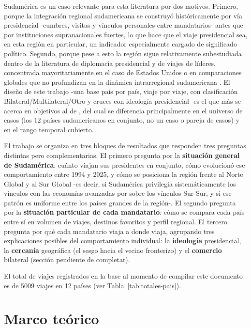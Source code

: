 \documentclass[11pt,a4paper]{article}
\begin{document}
Sudam\'erica es un caso relevante para esta literatura por dos motivos. Primero, porque la integraci\'on regional sudamericana se construy\'o hist\'oricamente por v\'ia presidencial -cumbres, visitas y v\'inculos personales entre mandatarios- antes que por instituciones supranacionales fuertes, lo que hace que el viaje presidencial sea, en esta regi\'on en particular, un indicador especialmente cargado de significado pol\'itico. Segundo, porque pese a esto la regi\'on sigue relativamente subestudiada dentro de la literatura de diplomacia presidencial y de viajes de l\'ideres, concentrada mayoritariamente en el caso de Estados Unidos o en comparaciones globales que no profundizan en la din\'amica intrarregional sudamericana \citep{thiersPoliticalLeadersRole2025}. El dise\~no de este trabajo -una base pa\'is por pa\'is, viaje por viaje, con clasificaci\'on Bilateral/Multilateral/Otro y cruces con ideolog\'ia presidencial- es el que m\'as se acerca en objetivos al de \citep{frenkelDiplomaciaPresidencialPolitica2026}, del cual se diferencia principalmente en el universo de casos (los 12 pa\'ises sudamericanos en conjunto, no un caso o pareja de casos) y en el rango temporal cubierto.

El trabajo se organiza en tres bloques de resultados que responden tres preguntas distintas pero complementarias. El primero pregunta por la \textbf{situaci\'on general de Sudam\'erica}: cu\'anto viajan sus presidentes en conjunto, c\'omo evolucion\'o ese comportamiento entre 1994 y 2025, y c\'omo se posiciona la regi\'on frente al Norte Global y al Sur Global -es decir, si Sudam\'erica privilegia sistem\'aticamente los v\'inculos con las econom\'ias avanzadas por sobre los v\'inculos Sur-Sur, y si ese patr\'on es uniforme entre los pa\'ises grandes de la regi\'on-. El segundo pregunta por la \textbf{situaci\'on particular de cada mandatario}: c\'omo se compara cada pa\'is entre s\'i en volumen de viajes, destinos favoritos y perfil regional. El tercero pregunta por qu\'e cada mandatario viaja a donde viaja, agrupando tres explicaciones posibles del comportamiento individual: la \textbf{ideolog\'ia} presidencial, la \textbf{cercan\'ia} geogr\'afica (el sesgo hacia el vecino fronterizo) y el \textbf{comercio} bilateral (secci\'on pendiente de completar).

El total de viajes registrados en la base al momento de compilar este documento es de 5009 viajes en 12 pa\'ises (ver Tabla~\ref{tab:totales-pais}).

\section{Marco te\'orico}
\end{document}
